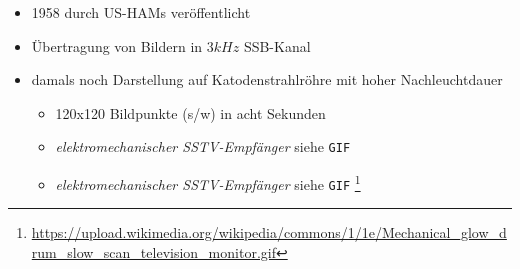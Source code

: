 \begin{frame}
    \begin{itemize}
        \item 1958 durch US-HAMs veröffentlicht
        \item Übertragung von Bildern in $3 kHz$ SSB-Kanal
        \item damals noch Darstellung auf Katodenstrahlröhre mit hoher Nachleuchtdauer
        \begin{itemize}
            \item 120x120 Bildpunkte (s/w) in acht Sekunden
            \item \emph{elektromechanischer SSTV-Empfänger} siehe \texttt{GIF}
            \item \emph{elektromechanischer SSTV-Empfänger} siehe \texttt{GIF}
                  \footnote{\url{https://upload.wikimedia.org/wikipedia/commons/1/1e/Mechanical_glow_drum_slow_scan_television_monitor.gif}}
        \end{itemize}
    \end{itemize}

\end{frame}

